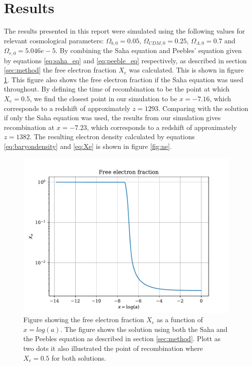\documentclass[onecolumn]{aastex62}
\begin{document}
\section{Results}
\label{sec:results}
The results presented in this report were simulated using the following values for relevant cosmological parameters: $\Omega_{b,0}=0.05$, $\Omega_{CDM,0}=0.25$, $\Omega_{\Lambda,0}=0.7$ and $\Omega_{r,0}=5.046e-5$. By combining the Saha equation and Peebles' equation given by equations \ref{eq:saha_eq} and \ref{eq:peeble_eq} respectively, as described in section \ref{sec:method} the free electron fraction $X_e$ was calculated. This is shown in figure \ref{fig:xe}. This figure also shows the free electron fraction if the Saha equation was used throughout. By defining the time of recombination to be the point at which $X_e=0.5$, we find the closest point in our simulation to be $x=-7.16$, which corresponds to a redshift of approximately $z=1293$. Comparing with the solution if only the Saha equation was used, the results from our simulation gives recombination at $x=-7.23$, which corresponds to a redshift of approximately $z=1382$. The resulting electron density calculated by equations \ref{eq:baryondensity} and \ref{eq:Xe} is shown in figure \ref{fig:ne}. 
\begin{figure}
    \includegraphics[scale=0.8]{figures/xe.pdf}
    \caption{Figure showing the free electron fraction $X_e$ as a function of $x=log(a)$. The figure shows the solution using both the Saha and the Peebles equation as described in section \ref{sec:method}. Plott as two dots it also illustrated the point of recombination where $X_e=0.5$ for both solutions.}
    \label{fig:xe}
\end{figure}
\end{document}
